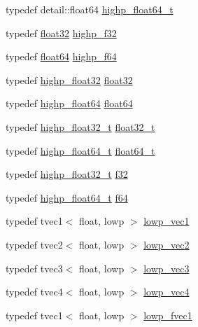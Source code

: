 \begin{DoxyCompactItemize}
typedef detail\+::float64 \hyperlink{namespaceglm_ae8b3b2ace5be2a61c6bf63f12643fa15}{highp\+\_\+float64\+\_\+t}
\item 
typedef \hyperlink{group__gtc__type__precision_ga814f2f65354b6588b067cc5c67a6b340}{float32} \hyperlink{namespaceglm_a48d80b6fd3a40b71b2e414493832d1ca}{highp\+\_\+f32}
\item 
typedef \hyperlink{group__gtc__type__precision_gab721f828b41f46b20cf4883b50733d3b}{float64} \hyperlink{namespaceglm_ab1306a5a8ae99fb2867b548b1546bbe0}{highp\+\_\+f64}
\item 
typedef \hyperlink{namespaceglm_a91af7513c1102410646f2c435ca29be5}{highp\+\_\+float32} \hyperlink{group__gtc__type__precision_ga814f2f65354b6588b067cc5c67a6b340}{float32}
\item 
typedef \hyperlink{namespaceglm_ab871a78c548d2fa53e1e8ec64a46eee7}{highp\+\_\+float64} \hyperlink{group__gtc__type__precision_gab721f828b41f46b20cf4883b50733d3b}{float64}
\item 
typedef \hyperlink{namespaceglm_a4e16a7818d09e2da3b81765999f23928}{highp\+\_\+float32\+\_\+t} \hyperlink{group__gtc__type__precision_ga642737ae3e7c434b366f2191e6944bf2}{float32\+\_\+t}
\item 
typedef \hyperlink{namespaceglm_ae8b3b2ace5be2a61c6bf63f12643fa15}{highp\+\_\+float64\+\_\+t} \hyperlink{group__gtc__type__precision_gade966a3eb25ebeb16dd53c40d3fdeb46}{float64\+\_\+t}
\item 
typedef \hyperlink{namespaceglm_a4e16a7818d09e2da3b81765999f23928}{highp\+\_\+float32\+\_\+t} \hyperlink{group__gtc__type__precision_ga0ec999b57f5330d9021256e96038df04}{f32}
\item 
typedef \hyperlink{namespaceglm_ae8b3b2ace5be2a61c6bf63f12643fa15}{highp\+\_\+float64\+\_\+t} \hyperlink{group__gtc__type__precision_ga2bba392e555124b36cde6abba349bab3}{f64}
\item 
typedef tvec1$<$ float, lowp $>$ \hyperlink{namespaceglm_ae48c64f920be353ece773ff367f0161c}{lowp\+\_\+vec1}
\item 
typedef tvec2$<$ float, lowp $>$ \hyperlink{namespaceglm_aaa6feab0c0e87cd19c19afc24c807720}{lowp\+\_\+vec2}
\item 
typedef tvec3$<$ float, lowp $>$ \hyperlink{namespaceglm_aca2a956a73b6aca282fa361a1cbedcc3}{lowp\+\_\+vec3}
\item 
typedef tvec4$<$ float, lowp $>$ \hyperlink{namespaceglm_a6ad6a0095c935cb38e0899ffd70bf739}{lowp\+\_\+vec4}
\item 
typedef tvec1$<$ float, lowp $>$ \hyperlink{namespaceglm_a2429817c48bcb7e0d489395bba6a6c34}{lowp\+\_\+fvec1}

\end{DoxyCompactItemize}

